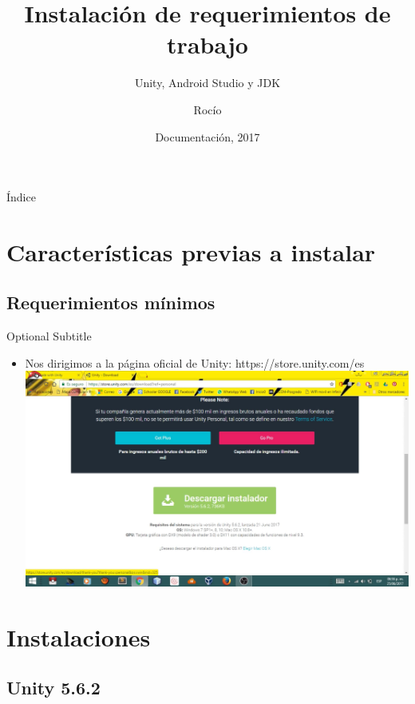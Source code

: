 \documentclass{beamer}
\title{Instalación de requerimientos de trabajo}
\subtitle{Unity, Android Studio y JDK}
\author{ Rocío\inst{1}}
\institute[Universities of Somewhere and Elsewhere] %
{
  \inst{1}%
  Instituto Politécnico Nacional
  \and
  \inst{2}%
  Escuela Superior de Cómputo}
\date{Documentación, 2017}
\begin{document}
\begin{frame}
  \titlepage
\end{frame}

\begin{frame}{Índice}
  \tableofcontents
\end{frame}

\section{Características previas a instalar}

\subsection{Requerimientos mínimos}

\begin{frame}{01}{Optional Subtitle}
  \begin{itemize}
  \item {
    Nos dirigimos a la página oficial de Unity:
    https://store.unity.com/es
  }
  \includegraphics[width=\linewidth]{image/IU01}
  \end{itemize}
\end{frame}




\section{Instalaciones}

\subsection{Unity 5.6.2}
\end{document}
